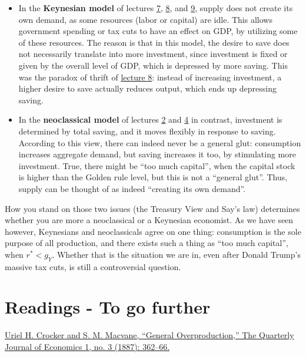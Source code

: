 \documentclass[]{book}
\theoremstyle{definition}
\theoremstyle{definition}
\theoremstyle{definition}
\theoremstyle{remark}
\begin{document}
\begin{itemize}
\item
  In the \textbf{Keynesian model} of lectures
  \protect\hyperlink{cons-function}{7},
  \protect\hyperlink{paradox-thrift}{8}, and
  \protect\hyperlink{redistributive}{9}, supply does not create its own
  demand, as some resources (labor or capital) are idle. This allows
  government spending or tax cuts to have an effect on GDP, by utilizing
  some of these resources. The reason is that in this model, the desire
  to save does not necessarily translate into more investment, since
  investment is fixed or given by the overall level of GDP, which is
  depressed by more saving. This was the paradox of thrift of
  \href{lecture8.html}{lecture 8}: instead of increasing investment, a
  higher desire to save actually reduces output, which ends up
  depressing saving.
\item
  In the \textbf{neoclassical model} of lectures
  \protect\hyperlink{solow}{2} and \protect\hyperlink{olg}{4} in
  contrast, investment is determined by total saving, and it moves
  flexibly in response to saving. According to this view, there can
  indeed never be a general glut: consumption increases aggregate
  demand, but saving increases it too, by stimulating more investment.
  True, there might be ``too much capital'', when the capital stock is
  higher than the Golden rule level, but this is not a ``general glut''.
  Thus, supply can be thought of as indeed ``creating its own demand''.
\end{itemize}

How you stand on those two issues (the Treasury View and Say's law)
determines whether you are more a neoclassical or a Keynesian economist.
As we have seen however, Keynesians and neoclassicals agree on one
thing: consumption is the sole purpose of all production, and there
exists such a thing as ``too much capital'', when \(r^{*}<g_Y\). Whether
that is the situation we are in, even after Donald Trump's massive tax
cuts, is still a controversial question.

\section*{Readings - To go further}\label{readings---to-go-further-7}

\href{https://doi.org/10.2307/1882763}{Uriel H. Crocker and S. M.
Macvane, ``General Overproduction,'' The Quarterly Journal of Economics
1, no. 3 (1887): 362--66.}
\end{document}
